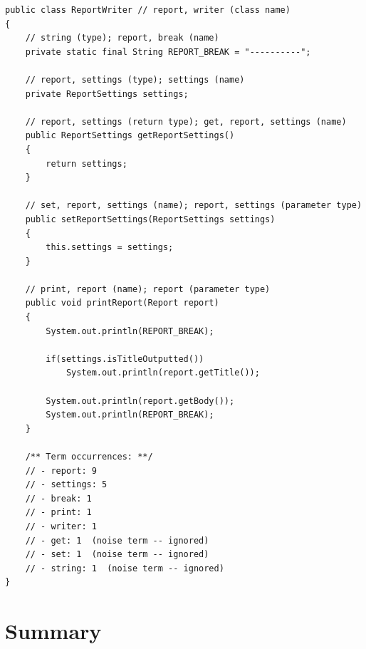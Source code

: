\begin{lstlisting}[caption={Code sample showing the extraction of terms from various elements of the source code}, label={lst:extraction_example}, float=t]
public class ReportWriter // report, writer (class name)
{   
    // string (type); report, break (name)
    private static final String REPORT_BREAK = "----------";

    // report, settings (type); settings (name)
    private ReportSettings settings;
    
    // report, settings (return type); get, report, settings (name)
    public ReportSettings getReportSettings()
    {
        return settings;
    }
    
    // set, report, settings (name); report, settings (parameter type)
    public setReportSettings(ReportSettings settings)
    {
        this.settings = settings;
    }
    
    // print, report (name); report (parameter type)
    public void printReport(Report report)
    {
        System.out.println(REPORT_BREAK);
        
        if(settings.isTitleOutputted())
            System.out.println(report.getTitle());
            
        System.out.println(report.getBody());
        System.out.println(REPORT_BREAK);
    }

	/** Term occurrences: **/
	// - report: 9
	// - settings: 5
	// - break: 1
	// - print: 1
	// - writer: 1
	// - get: 1  (noise term -- ignored)
	// - set: 1  (noise term -- ignored)
	// - string: 1  (noise term -- ignored)
}
\end{lstlisting}

% 
% 
% 
% 
% 
% 
% 



\section{Summary} %
\label{sec:summary}






